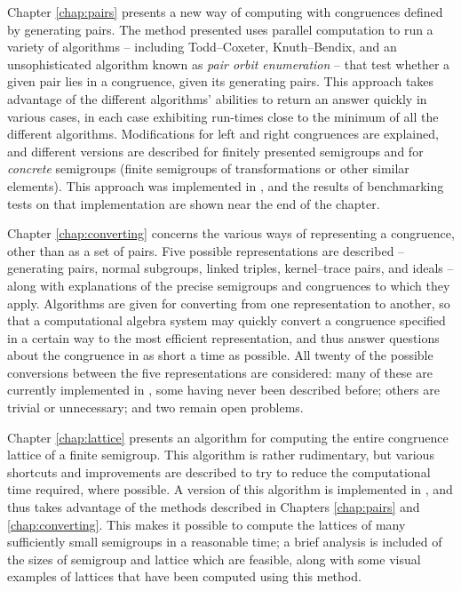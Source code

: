 Chapter \ref{chap:pairs} presents a new way of computing with congruences
defined by generating pairs.  The method presented uses parallel computation to
run a variety of algorithms -- including Todd--Coxeter, Knuth--Bendix, and an
unsophisticated algorithm known as \textit{pair orbit enumeration} -- that test
whether a given pair lies in a congruence, given its generating pairs.  This
approach takes advantage of the different algorithms' abilities to return an
answer quickly in various cases, in each case exhibiting run-times close to the
minimum of all the different algorithms.  Modifications for left and right
congruences are explained, and different versions are described for finitely
presented semigroups and for \textit{concrete} semigroups (finite semigroups of
transformations or other similar elements).  This approach was implemented in
\libsemigroups{} \cite{libsemigroups}, and the results of benchmarking tests on
that implementation are shown near the end of the chapter.

Chapter \ref{chap:converting} concerns the various ways of representing a
congruence, other than as a set of pairs.  Five possible representations are
described -- generating pairs, normal subgroups, linked triples, kernel--trace
pairs, and ideals -- along with explanations of the precise semigroups and
congruences to which they apply.  Algorithms are given for converting from one
representation to another, so that a computational algebra system may quickly
convert a congruence specified in a certain way to the most efficient
representation, and thus answer questions about the congruence in as short a
time as possible.  All twenty of the possible conversions between the five
representations are considered: many of these are currently implemented in
\Semigroups{} \cite{semigroups}, some having never been described before; others
are trivial or unnecessary; and two remain open problems.

Chapter \ref{chap:lattice} presents an algorithm for computing the entire
congruence lattice of a finite semigroup.  This algorithm is rather rudimentary,
but various shortcuts and improvements are described to try to reduce the
computational time required, where possible.  A version of this algorithm is
implemented in \Semigroups{}, and thus takes advantage of the methods described
in Chapters \ref{chap:pairs} and \ref{chap:converting}.  This makes it possible
to compute the lattices of many sufficiently small semigroups in a reasonable
time; a brief analysis is included of the sizes of semigroup and lattice which
are feasible, along with some visual examples of lattices that have been
computed using this method.

